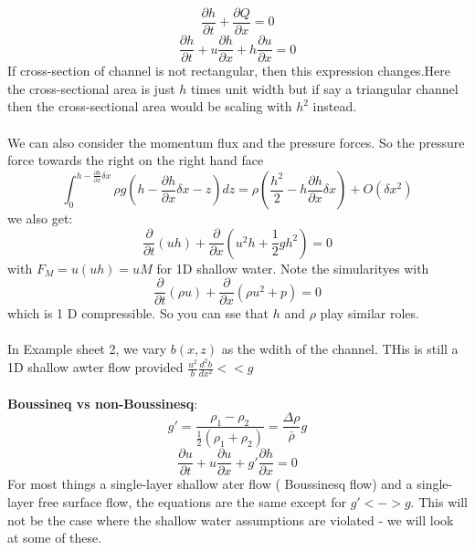 \documentclass{article}
\begin{document}
 $$
 \frac{\partial h}{\partial t} + \frac{\partial Q}{\partial x} = 0
 $$
 $$
  \frac{\partial h}{\partial t} + u \frac{\partial h}{\partial x} + h \frac{\partial u}{\partial x} = 0
 $$
 If cross-section of channel is not rectangular, then this expression changes.Here the cross-sectional area is just $h$ times unit width but if say a triangular channel then the cross-sectional area would be scaling with $h^2$ instead.\\\\
  We can also consider the momentum flux and the pressure forces. So the pressure force towards the right on the right hand face
  $$
\int_0^{h- \frac{\partial h}{\partial x} \delta x} \rho g( h - \frac{\partial h}{\partial x} \delta x - z) dz  = \rho ( \frac{h^2}{2} - h \frac{\partial h}{\partial x} \delta x) + O( \delta x^2)
  $$
   we also get:
   $$
   \frac{\partial}{\partial t} ( uh) + \frac{\partial}{\partial x} ( u^2 h + \frac{1}{2} gh^2) = 0
   $$
    with $F_M = u(uh) = uM$ for 1D shallow water. Note the simularityes with 
    $$
     \frac{\partial}{\partial t} ( \rho u) + \frac{\partial}{\partial x} ( \rho u^2 + p) = 0
    $$
    which is 1 D compressible. So you can sse that $h$ and $\rho$ play similar roles.\\\\
    In Example sheet 2, we vary $b(x,z)$ as the wdith of the channel. THis is still a 1D shallow awter flow provided $\frac{u^2}{b} \frac{ d^2 b}{dx^2} <<g$\\\\
    \textbf{ Boussineq vs non-Boussinesq}:\\
    $$
    g' = \frac{\rho_1- \rho_2}{\frac{1}{2}(\rho_1 + \rho_2)}= \frac{\Delta \rho}{\bar \rho} g
    $$
    $$ 
    \frac{\partial u}{\partial t} + u \frac{\partial u}{\partial x} + g' \frac{\partial h}{\partial x} = 0
    $$
     For most things a single-layer shallow ater flow ( Boussinesq flow) and a single-layer free surface flow, the equations are the same except for $g' <-> g$. This will not be the case where the shallow water assumptions are violated - we will look at some of these.
\end{document}
